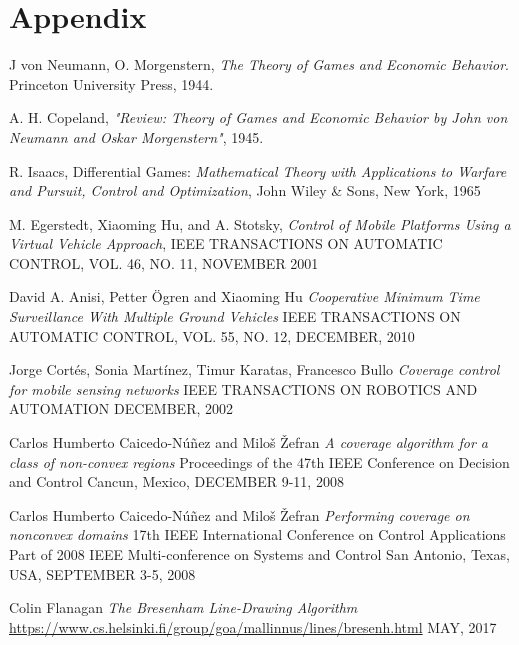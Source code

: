 \documentclass[ebook,11pt] {kth-mag}
\begin{document}
\chapter{Appendix}
\listoffigures
\begin{thebibliography}{9}


J von Neumann, O. Morgenstern, \emph{The Theory of Games and Economic Behavior}. Princeton University Press, 1944.


A. H. Copeland, \emph{"Review: Theory of Games and Economic Behavior by John von Neumann and Oskar Morgenstern"}, 1945.


R. Isaacs, Differential Games:  \emph{Mathematical Theory with Applications to Warfare and Pursuit, Control and Optimization}, John Wiley \& Sons, New York, 1965



  	M. Egerstedt, Xiaoming Hu, and A. Stotsky,
  	\emph{Control of Mobile Platforms Using a Virtual Vehicle Approach},
	IEEE TRANSACTIONS ON AUTOMATIC CONTROL, 
    VOL. 46, NO. 11, 
    NOVEMBER 2001
    
	David A. Anisi, Petter \"{O}gren and Xiaoming Hu
	\emph{Cooperative Minimum Time Surveillance With Multiple Ground Vehicles}
    IEEE TRANSACTIONS ON AUTOMATIC CONTROL, 
    VOL. 55, NO. 12, 
    DECEMBER, 2010
  
    
	Jorge Cort\'{e}s, Sonia Mart\'{i}nez, Timur Karatas, Francesco Bullo
	\emph{Coverage control for mobile sensing networks}
    IEEE TRANSACTIONS ON ROBOTICS AND AUTOMATION 
    DECEMBER, 2002

	Carlos Humberto Caicedo-N\'{u}\~{n}ez and Milo\v{s} \v{Z}efran
	\emph{A coverage algorithm for a class of non-convex regions}
    Proceedings of the 47th IEEE Conference on Decision and Control
	Cancun, Mexico, 
    DECEMBER 9-11, 2008
    
	Carlos Humberto Caicedo-N\'{u}\~{n}ez and Milo\v{s} \v{Z}efran
    \emph{Performing coverage on nonconvex domains}
    17th IEEE International Conference on Control Applications 
    Part of 2008 IEEE Multi-conference on Systems and Control
    San Antonio, Texas, USA, SEPTEMBER 3-5, 2008
    
  
	Colin Flanagan
    \emph{The Bresenham Line-Drawing Algorithm}
	\url{https://www.cs.helsinki.fi/group/goa/mallinnus/lines/bresenh.html}
    MAY, 2017    
    

\end{thebibliography}
\end{document}
